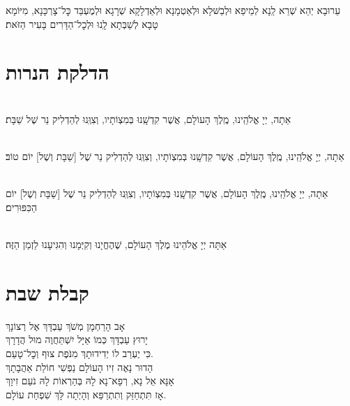 \documentclass[twoside, openany, parskip=half, 11pt]{book}
\begin{document}
עֵרוּבָא יְהֵא שְׁרֵא לַֽנָא לְמֵיפֵא וּלְבַשּּׁלָא וּלְאַטְמָנָא וּלְאַדְלָקָא שְׁרָגָא וּלְמֶעְבַּד כׇּל־צָרְכָּנָא, מִיּוֹמָא טָבָא לְשַׁבְּתָא לָֽנוּ וּלְכׇל־הַדָּרִים בָּעִיר הַזּׂאת׃‏


\vspace{\baselineskip}
{\let\clearpage\relax
\chapter[הדלקת הנרות שבת ויום טוב]{ הדלקת הנרות }}

\\
אַתָה, יְיָ אֱלֹהֵֽינוּ, מֶֽלֶךְ הָעוֹלָם, אֲשֶׁר קִדְשָֽׁנוּ בְּמִצְוֹתָיו, וְצִוְּֽנוּ לְהַדְלִיק נֵר שֶׁל שַׁבָּת׃

\\
אַתָה, יְיָ אֱלֹהֵֽינוּ, מֶֽלֶךְ הָעוֹלָם, אֲשֶׁר קִדְשָֽׁנוּ בְּמִצְוֹתָיו, וְצִוְּֽנוּ לְהַדְלִיק נֵר שֶׁל
[שַׁבָּת וְשֶׁל] יוֹם טוֹב׃

\\
אַתָה, יְיָ אֱלֹהֵֽינוּ, מֶֽלֶךְ הָעוֹלָם, אֲשֶׁר קִדְשָֽׁנוּ בְּמִצְוֹתָיו, וְצִוְּֽנוּ לְהַדְלִיק נֵר שֶׁל
[שַׁבָּת וְשֶׁל] יוֹם הַכִּפּוּרִים׃

\\
אַתָּה יְיָ אֱלֹהֵינוּ מֶלֶךְ הָעוֹלָם, שֶׁהֶחֱיָנוּ וְקִיְּמָנוּ וְהִגִּיעָנוּ לַזְמַן הַזֶּה׃



\chapter[קבלת שבת]{ קבלת שבת }
\label{kabalas_shabbos}

אָב הָרַחְמָן מְשֹׁךְ עַבְדָּךְ אֶל רְצוֹנָךְ\\
יָרוּץ עַבְדָּךְ כְּמוֹ אַיָּל יִשְׁתַּחֲוֶה מוּל הֲדָרָךְ\\
כִּי יֶעְרַב לוֹ יְדִידוּתָךְ מִנֹּפֶת צוּף וְכׇל־טָעַם.\\


הָדוּר נָאֶה זִיו הָעוֹלָם נַפְשִׁי חוֹלַת אַהֲבָתָךְ\\
אָנָּא אֵל נָא, רְפָא־נָא לָהּ בְּהַרְאוֹת לָהּ נֹעַם זִיוָךְ\\
אָז תִּתְחַזֵּק וְתִתְרַפֵּא וְהָיְתָה לָּךְ שִׁפְחַת עוֹלָם.\\
\end{document}
